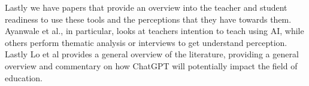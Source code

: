 \documentclass[manuscript,screen,acmsmall]{acmart}
\begin{document}
    Lastly we have papers that provide an overview into the teacher and student readiness to use these tools and the perceptions that they have towards them. Ayanwale et al., in particular, looks at teachers intention to teach using AI, while others perform thematic analysis or interviews to get understand perception. Lastly Lo et al provides a general overview of the literature, providing a general overview and commentary on how ChatGPT will potentially impact the field of education.


    


\end{document}
